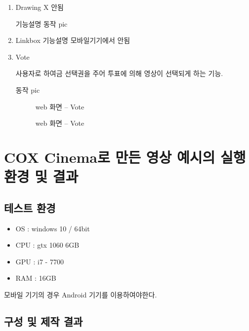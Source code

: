 \documentclass{oblivoir}
\newcommand{\spec}{
    \begin{itemize}
        \item OS : windows 10 / 64bit
        \item CPU : gtx 1060 6GB
        \item GPU : i7 - 7700
        \item RAM : 16GB
    \end{itemize}
    }
\begin{document}
\begin{enumerate}
    \item Drawing X 안됨

    기능설명
    동작 pic


    \item Linkbox
    기능설명 모바일기기에서 안됨

    \item Vote

    사용자로 하여금 선택권을 주어 투표에 의해 영상이 선택되게 하는 기능.

    동작 pic

    \begin{figure}[h!]
    \centering
    \caption{web 화면 – Vote}
    \end{figure} 


    \begin{figure}[h!]
    \centering
    \caption{web 화면 – Vote}
    \end{figure} 

\end{enumerate}

\section{ COX Cinema로 만든 영상 예시의 실행환경 및 결과 }

\subsection{테스트 환경 }
\spec
모바일 기기의 경우 Android 기기를 이용하여야한다.

\subsection{ 구성 및 제작 결과}
\end{document}
